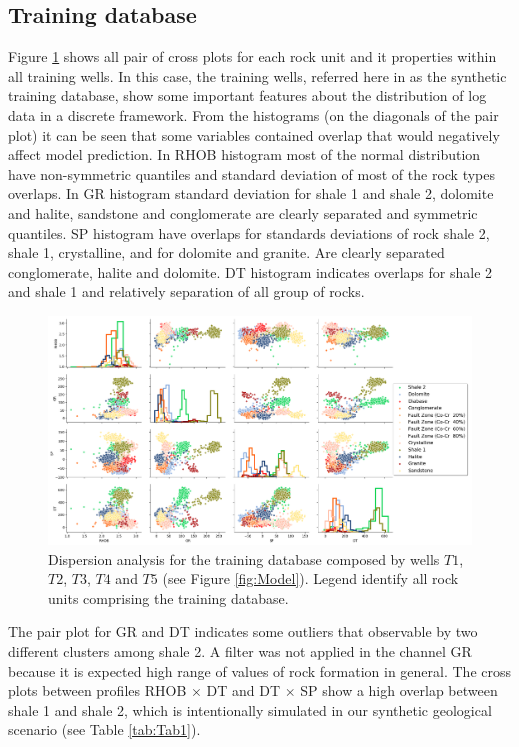 \documentclass[preprint,12pt]{elsarticle}
\begin{document}
\subsection{Training database}
Figure \ref{fig:BD} shows all pair of cross plots for each rock unit and it properties within all training wells. In this case, the training wells, referred here in as the synthetic training database, show some important features about the distribution of log data in a discrete framework. From the histograms (on the diagonals of the pair plot) it can be seen that some variables contained overlap that would negatively affect model prediction. In RHOB histogram most of the normal distribution  have non-symmetric quantiles  and standard deviation of most of the rock types overlaps. In GR histogram standard deviation for shale 1 and shale 2, dolomite and halite, sandstone and conglomerate are clearly separated and symmetric quantiles. SP histogram have overlaps  for standards deviations of rock shale 2, shale 1, crystalline, and for dolomite and granite. Are clearly separated conglomerate, halite and dolomite. DT histogram indicates overlaps for shale 2 and shale 1 and relatively separation of all group of rocks.  


\begin{figure}[!htb]
	\centering
	\includegraphics[scale=0.38]{imagens/BDsintetico_convolvido.png}
	\caption{Dispersion analysis for the training database composed by wells $T1$, $T2$, $T3$, $T4$ and $T5$ (see Figure \ref{fig:Model}). Legend identify all rock units comprising the training database.}
	\label{fig:BD}
\end{figure}



The pair plot for GR and DT indicates some outliers that observable by two different clusters among shale 2. A filter was not applied in the channel GR because it is expected high range of values of rock formation in general.  The cross plots between profiles RHOB $ \times $ DT and DT $ \times$ SP show a high overlap between shale 1 and shale 2, which is intentionally simulated in our synthetic geological scenario (see Table \ref{tab:Tab1}).
   
\end{document}
